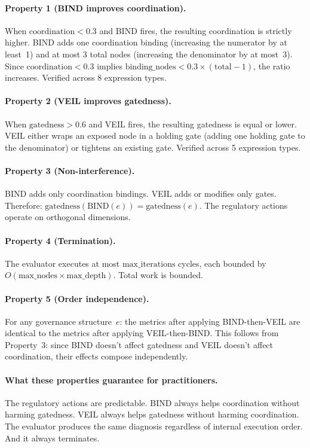 \documentclass[sigconf,nonacm]{acmart}
\begin{document}
\paragraph{Property 1 (BIND improves coordination).}
When $\mathrm{coordination} < 0.3$ and BIND fires, the resulting
coordination is strictly higher. BIND adds one coordination binding
(increasing the numerator by at least~1) and at most 3 total nodes
(increasing the denominator by at most~3). Since
$\mathrm{coordination} < 0.3$ implies $\text{binding\_nodes} < 0.3 \times
(\text{total} - 1)$, the ratio increases. Verified across 8 expression
types.

\paragraph{Property 2 (VEIL improves gatedness).}
When $\mathrm{gatedness} > 0.6$ and VEIL fires, the resulting gatedness is
equal or lower. VEIL either wraps an exposed node in a holding gate (adding
one holding gate to the denominator) or tightens an existing gate. Verified
across 5 expression types.

\paragraph{Property 3 (Non-interference).}
BIND adds only coordination bindings. VEIL adds or modifies only gates.
Therefore: $\mathrm{gatedness}(\mathrm{BIND}(e)) = \mathrm{gatedness}(e)$.
The regulatory actions operate on orthogonal dimensions.

\paragraph{Property 4 (Termination).}
The evaluator executes at most $\mathrm{max\_iterations}$ cycles, each
bounded by $O(\mathrm{max\_nodes} \times \mathrm{max\_depth})$. Total work
is bounded.

\paragraph{Property 5 (Order independence).}
For any governance structure~$e$: the metrics after applying BIND-then-VEIL
are identical to the metrics after applying VEIL-then-BIND. This follows
from Property~3: since BIND doesn't affect gatedness and VEIL doesn't
affect coordination, their effects compose independently.

\medskip

\paragraph{What these properties guarantee for practitioners.}
The regulatory actions are predictable. BIND always helps coordination
without harming gatedness. VEIL always helps gatedness without harming
coordination. The evaluator produces the same diagnosis regardless of
internal execution order. And it always terminates.
\end{document}
